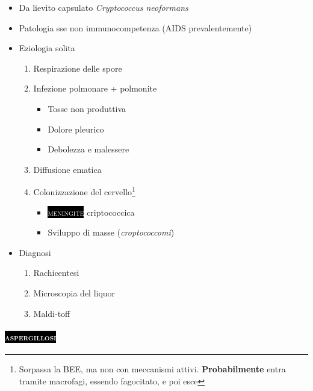 \documentclass[italian,]{article}
\providecommand{\tightlist}{%
  \setlength{\itemsep}{0pt}\setlength{\parskip}{0pt}}
\newcommand{\pat}[1]{\colorbox{black}{\textcolor{white}{\textsc{#1}}}}
\begin{document}
\begin{itemize}
\tightlist
\item
  Da lievito capsulato \emph{Cryptococcus neoformans}
\item
  Patologia sse non immunocompetenza (AIDS prevalentemente)
\item
  Eziologia solita

  \begin{enumerate}
  \def\labelenumi{\arabic{enumi}.}
  \tightlist
  \item
    Respirazione delle spore
  \item
    Infezione polmonare + polmonite

    \begin{itemize}
    \tightlist
    \item
      Tosse non produttiva
    \item
      Dolore pleurico
    \item
      Debolezza e malessere
    \end{itemize}
  \item
    Diffusione ematica
  \item
    Colonizzazione del cervello\footnote{Sorpassa la BEE, ma non con
      meccanismi attivi. \textbf{Probabilmente} entra tramite macrofagi,
      essendo fagocitato, e poi esce}

    \begin{itemize}
    \tightlist
    \item
      \pat{meningite} criptococcica
    \item
      Sviluppo di masse (\emph{croptococcomi})
    \end{itemize}
  \end{enumerate}
\item
  Diagnosi

  \begin{enumerate}
  \def\labelenumi{\arabic{enumi}.}
  \tightlist
  \item
    Rachicentesi
  \item
    Microscopia del liquor
  \item
    Maldi-toff
  \end{enumerate}
\end{itemize}

\hypertarget{section-6}{%
\paragraph{\texorpdfstring{\pat{aspergillosi}}{}}\label{section-6}}
\end{document}
